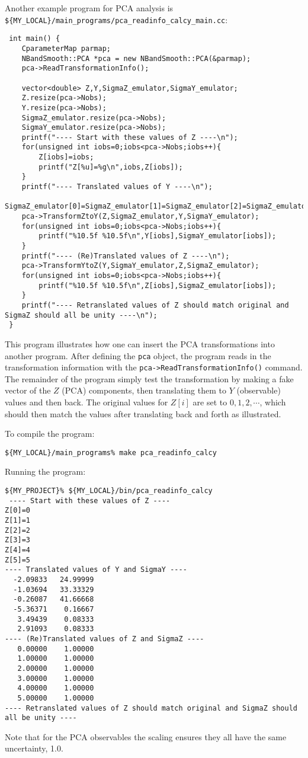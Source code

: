 \documentclass[UserManual.tex]{subfiles}
\begin{document}
Another example program for PCA analysis is {\tt \$\{MY\_LOCAL\}/main\_programs/pca\_readinfo\_calcy\_main.cc}:
{\tt\begin{verbatim}
 int main() {
	CparameterMap parmap;
    NBandSmooth::PCA *pca = new NBandSmooth::PCA(&parmap);
    pca->ReadTransformationInfo();
    
	vector<double> Z,Y,SigmaZ_emulator,SigmaY_emulator;
	Z.resize(pca->Nobs);
	Y.resize(pca->Nobs);
	SigmaZ_emulator.resize(pca->Nobs);
	SigmaY_emulator.resize(pca->Nobs);
	printf("---- Start with these values of Z ----\n");
	for(unsigned int iobs=0;iobs<pca->Nobs;iobs++){
		Z[iobs]=iobs;
		printf("Z[%u]=%g\n",iobs,Z[iobs]);
	}
	printf("---- Translated values of Y ----\n");
	SigmaZ_emulator[0]=SigmaZ_emulator[1]=SigmaZ_emulator[2]=SigmaZ_emulator[3]=SigmaZ_emulator[4]=SigmaZ_emulator[5]=1.0;	
	pca->TransformZtoY(Z,SigmaZ_emulator,Y,SigmaY_emulator);
	for(unsigned int iobs=0;iobs<pca->Nobs;iobs++){
		printf("%10.5f %10.5f\n",Y[iobs],SigmaY_emulator[iobs]);
	}
	printf("---- (Re)Translated values of Z ----\n");
	pca->TransformYtoZ(Y,SigmaY_emulator,Z,SigmaZ_emulator);
	for(unsigned int iobs=0;iobs<pca->Nobs;iobs++){
		printf("%10.5f %10.5f\n",Z[iobs],SigmaZ_emulator[iobs]);
	}
	printf("---- Retranslated values of Z should match original and SigmaZ should all be unity ----\n");
 }
\end{verbatim}}
This program illustrates how one can insert the PCA transformations into another program. After defining the {\tt pca} object, the program reads in the transformation information with the {\tt pca->ReadTransformationInfo()} command. The remainder of the program simply test the transformation by  making a fake vector of the $Z$ (PCA) components, then translating them to $Y$ (observable) values and then back. The original values for $Z[i]$ are set to $0,1,2,\cdots$, which should then match the values after translating back and forth as illustrated. 

To compile the program:
{\tt\begin{verbatim}
${MY_LOCAL}/main_programs% make pca_readinfo_calcy
\end{verbatim}}
Running the program:
{\tt\begin{verbatim}
${MY_PROJECT}% ${MY_LOCAL}/bin/pca_readinfo_calcy
 ---- Start with these values of Z ----
Z[0]=0
Z[1]=1
Z[2]=2
Z[3]=3
Z[4]=4
Z[5]=5
---- Translated values of Y and SigmaY ----
  -2.09833   24.99999
  -1.03694   33.33329
  -0.26087   41.66668
  -5.36371    0.16667
   3.49439    0.08333
   2.91093    0.08333
---- (Re)Translated values of Z and SigmaZ ----
   0.00000    1.00000
   1.00000    1.00000
   2.00000    1.00000
   3.00000    1.00000
   4.00000    1.00000
   5.00000    1.00000
---- Retranslated values of Z should match original and SigmaZ should all be unity ----
\end{verbatim}}
Note that for the PCA observables the scaling ensures they all have the same uncertainty, 1.0. 
\end{document}
